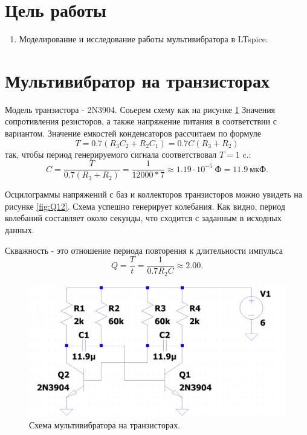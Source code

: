 \section*{Цель работы}

\begin{enumerate}
    \item Моделирование и исследование работы мультивибратора в LTspice.
\end{enumerate}



\section*{Мультивибратор на транзисторах}

Модель транзистора - 2N3904. Соьерем схему как на рисунке \ref{fig:мультивибр_транзисторы_схема} 
Значения сопротивления резисторов, а также напряжение питания в 
соответствии с вариантом. Значение емкостей конденсаторов рассчитаем по формуле
\begin{equation*}
    T=0.7(R_3C_2+R_2C_1)=0.7C(R_3+R_2)
\end{equation*}
так, чтобы период генерируемого сигнала соответствовал $T=1$ c.:
\begin{equation*}
    C=\frac{T}{0.7(R_3+R_2)}=\frac{1}{12000 * 7}\approx 1.19\cdot10^{-5}\ \text{Ф}=11.9\ \text{мкФ}.
\end{equation*}

Осцилограммы напряжений с баз и коллекторов транзисторов
можно увидеть на рисунке \ref{fig:Q12}. Схема успешно генерирует колебания. Как видно, период колебаний
составляет около секунды, что сходится с заданным в исходных данных.

Скважность - это отношение периода повторения к длительности импульса
\begin{equation*}
    Q=\frac{T}{t}=\frac{1}{0.7R_2C}\approx 2.00.
\end{equation*}

\begin{figure}[H]
    \centering
    \includegraphics[width=\linewidth]{figs/мультивибр_транзисторы_схема.png}
    \caption{Схема мультивибратора на транзисторах.}
    \label{fig:мультивибр_транзисторы_схема}
\end{figure}

